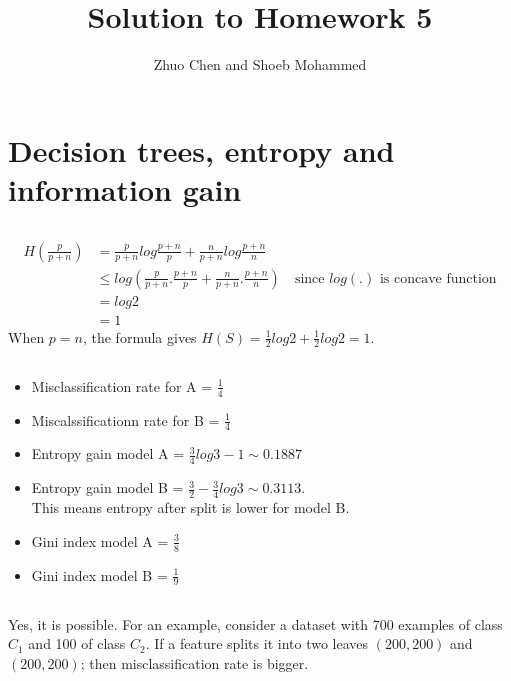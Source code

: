\documentclass{article}
\begin{document}
\title{Solution to Homework 5}
\author{Zhuo Chen and Shoeb Mohammed}
\maketitle

\newcommand{\QEDA}{\hfill\ensuremath{\blacksquare}}
\newcommand{\QEDB}{\hfill\ensuremath{\square}}

\section{Decision trees, entropy and information gain}

\subsection{}
\begin{equation}
  \label{eq:1.1}
  \begin{split}
  H\left(\frac{p}{p+n}\right) &= \frac{p}{p+n}log\frac{p+n}{p} + \frac{n}{p+n}log\frac{p+n}{n}\\
               &\leq log\left(\frac{p}{p+n}.\frac{p+n}{p} + \frac{n}{p+n}.\frac{p+n}{n}\right) \quad \text{since $log(.)$ is concave function} \\
			   &= log2 \\
			   &= 1
  \end{split}
\end{equation}
When $p=n$, the formula gives $H(S) = \frac{1}{2}log2 + \frac{1}{2}log2 = 1$.

\subsection{}
\begin{itemize}
	\item Misclassification rate for A = $\frac{1}{4}$
	\item Miscalssificationn rate for B = $\frac{1}{4}$
	\item Entropy gain model A = $\frac{3}{4}log3 - 1 \sim 0.1887$
	\item Entropy gain model B = $\frac{3}{2} - \frac{3}{4}log3 \sim 0.3113$. \\
	      This means entropy after split is lower for model B.
	\item Gini index model A = $\frac{3}{8}$
	\item Gini index model B = $\frac{1}{9}$
\end{itemize}

\subsection{}
Yes, it is possible. For an example, consider a dataset with 700 examples of class $C_1$ and 100 of class $C_2$.
If a feature splits it into two leaves $(200,200)$ and $(200,200)$; then misclassification rate is bigger.
\end{document}
